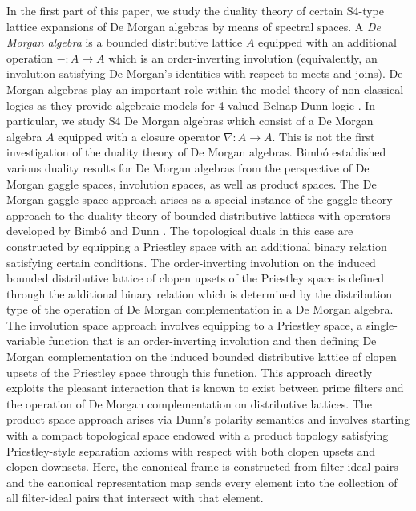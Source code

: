 \documentclass{amsart}
\theoremstyle{plain}
\theoremstyle{definition}
\begin{document}
In the first part of this paper, we study the duality theory of certain S4-type lattice expansions of De Morgan algebras by means of spectral spaces. A \emph{De Morgan algebra} is a bounded distributive lattice $A$ equipped with an additional operation $-\colon A\to A$ which is an order-inverting involution (equivalently, an involution satisfying De Morgan's identities with respect to meets and joins). De Morgan algebras play an important role within the model theory of non-classical logics as they provide algebraic models for 4-valued Belnap-Dunn logic \cite{belnap}. In particular, we study S4 De Morgan algebras which consist of a De Morgan algebra $A$ equipped with a closure operator $\nabla\colon A\to A$. This is not the first investigation of the duality theory of De Morgan algebras. Bimb\'o \cite{bimbo} established various duality results for De Morgan algebras from the perspective of De Morgan gaggle spaces, involution spaces, as well as product spaces. The De Morgan gaggle space approach arises as a special instance of the gaggle theory approach to the duality theory of bounded distributive lattices with operators developed by Bimb\'o and Dunn \cite{bimbo1}. The topological duals in this case are constructed by equipping a Priestley space with an additional binary relation satisfying certain conditions. The order-inverting involution on the induced bounded distributive lattice of clopen upsets of the Priestley space is defined through the additional binary relation which is determined by the distribution type of the operation of De Morgan complementation in a De Morgan algebra. The involution space approach involves equipping to a Priestley space, a single-variable function that is an order-inverting involution and then defining De Morgan complementation on the induced bounded distributive lattice of clopen upsets of the Priestley space through this function. This approach directly exploits the pleasant interaction that is known to exist between prime filters and the operation of De Morgan complementation on distributive lattices. The product space approach arises via Dunn's polarity semantics \cite{dunn} and involves starting with a compact topological space endowed with a product topology satisfying Priestley-style separation axioms with respect with both clopen upsets and clopen downsets. Here, the canonical frame is constructed from filter-ideal pairs and the canonical representation map sends every element into the collection of all filter-ideal pairs that intersect with that element.  
\end{document}
